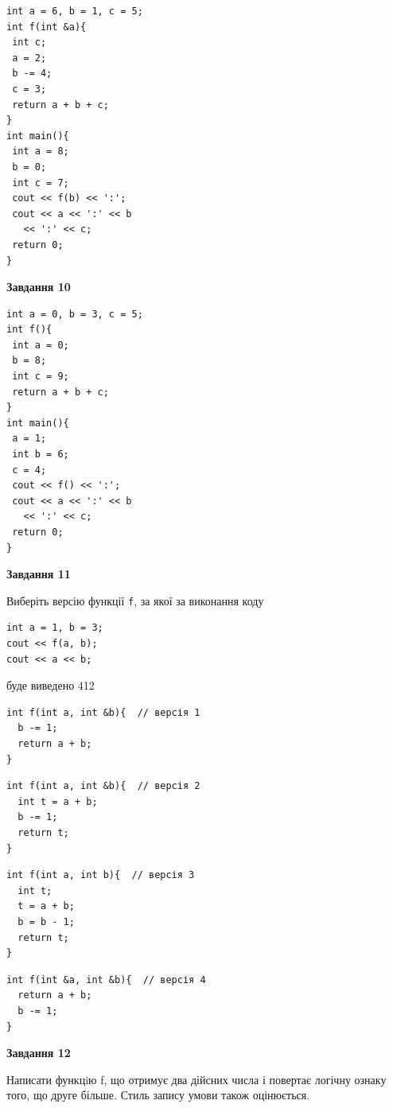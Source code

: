 \documentclass[12pt, ukrainian]{article}
\def\code#1{\Verb!#1!}
\begin{document}
{\begin {large}
\begin{minipage}[t]{7.0cm}
\begin{verbatim}
int a = 6, b = 1, c = 5;
int f(int &a){
 int c;
 a = 2;
 b -= 4;
 c = 3;
 return a + b + c;
}
int main(){
 int a = 8;
 b = 0;
 int c = 7;
 cout << f(b) << ':';
 cout << a << ':' << b 
   << ':' << c;
 return 0;
}
\end{verbatim}



\begin{center}
\textbf{Завдання 10}
\end{center}
\vspace{-8mm}

\begin{verbatim}
int a = 0, b = 3, c = 5;
int f(){
 int a = 0;
 b = 8;
 int c = 9;
 return a + b + c;
}
int main(){
 a = 1;
 int b = 6;
 c = 4;
 cout << f() << ':';
 cout << a << ':' << b 
   << ':' << c;
 return 0;
}
\end{verbatim}

\end{minipage}
\vline \hspace{1mm}
\begin{minipage}[t]{11.0cm}

\begin{center}
\textbf{Завдання 11}
\end{center}
Виберіть версію функції \code{f}, за якої за виконання коду
\begin{verbatim}
int a = 1, b = 3;
cout << f(a, b);
cout << a << b;
\end{verbatim}

буде виведено 412

\begin{verbatim}
int f(int a, int &b){  // версія 1
  b -= 1;
  return a + b;
}
\end{verbatim}

\vspace{-8mm}\begin{verbatim}
int f(int a, int &b){  // версія 2
  int t = a + b;
  b -= 1;
  return t;
}
\end{verbatim}

\vspace{-8mm}\begin{verbatim}
int f(int a, int b){  // версія 3
  int t;
  t = a + b;
  b = b - 1;
  return t;
}
\end{verbatim}

\vspace{-8mm}\begin{verbatim}
int f(int &a, int &b){  // версія 4
  return a + b;
  b -= 1;
}
\end{verbatim}



\begin{center}
\textbf{Завдання 12}
\end{center}

Написати функцiю f, що отримує два дійсних числа і повертає логічну ознаку того, що друге більше. Стиль запису умови також оцінюється.\par

\end{minipage}

\end {large}}
\newpage
\end{document}
